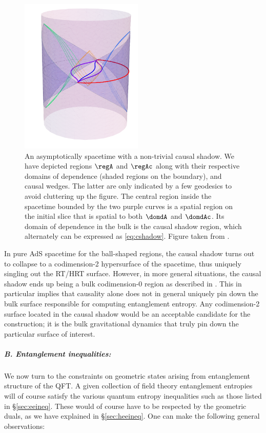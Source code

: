 \documentclass[12pt,openany]{book}
\begin{document}
\begin{figure}[h]
\begin{center}
\includegraphics[width=2.3in]{figures/CausalShadow}
 \caption{An asymptotically  spacetime with a non-trivial causal shadow. We have depicted regions $\regA$ and $\regAc$ along with their respective domains of dependence (shaded regions on the boundary), and causal wedges. The latter are only indicated by a few geodesics to avoid cluttering up the figure. The central region inside the spacetime bounded by the two purple curves is a spatial region on the initial slice that is spatial to both $\domdA$ and $\domdAc$. Its domain of dependence in the bulk is the causal shadow region, which alternately can be expressed as \eqref{eq:cshadow}. Figure taken from \cite{Headrick:2014cta}.}
\label{f:cshadow}
\end{center}
\end{figure}
%



In pure AdS spacetime for the ball-shaped regions, the causal shadow turns out to collapse to a codimension-2 hypersurface of the spacetime, thus uniquely singling out the RT/HRT surface. However, in more general situations, the causal shadow ends up being a bulk codimension-0 region as described in \cite{Headrick:2014cta}. This in particular implies that causality alone does not in general uniquely pin down the bulk surface responsible for computing entanglement entropy. Any codimension-2 surface located in the causal shadow would be an acceptable candidate for the construction; it is the bulk gravitational dynamics that truly pin down the particular surface of interest.

\subparagraph{B. Entanglement inequalities:} We now turn to the constraints on geometric states arising from entanglement structure of the QFT. A given collection of field theory entanglement entropies will of course satisfy the various quantum entropy inequalities such as those  listed in \S\ref{sec:eeineq}. These would of course have to be respected by the geometric duals, as we have explained in \S\ref{sec:heeineq}. One can make the following general observations:
\end{document}
